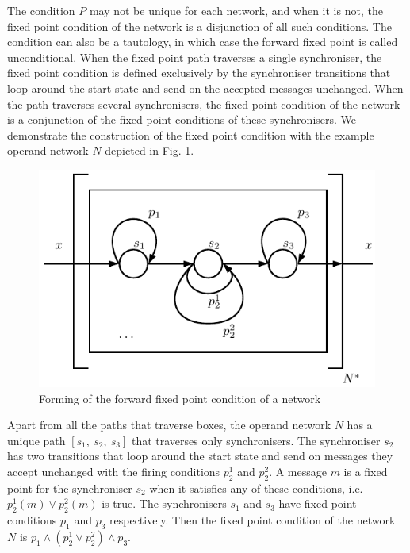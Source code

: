 The condition $P$ may not be unique for each network, and when it is not, the fixed point condition of the network is a disjunction of all such conditions. The condition can also be a tautology, in which case the forward fixed point is called unconditional. When the fixed point path traverses a single synchroniser, the fixed point condition is defined exclusively by the synchroniser transitions that loop around the start state and send on the accepted messages unchanged. When the path traverses several synchronisers, the fixed point condition of the network is a conjunction of the fixed point conditions of these synchronisers. We demonstrate the construction of the fixed point condition with the example operand network $N$ depicted in Fig. \ref{fig:ffp}.

\begin{figure}[h!]
\centering
\includegraphics[scale=0.8]{figs/chapter_04_ffp.pdf}
\caption{Forming of the forward fixed point condition of a network}
\label{fig:ffp}
\end{figure}

Apart from all the paths that traverse boxes, the operand network $N$ has a unique path $[s_1, \: s_2, \: s_3]$ that traverses only synchronisers. The synchroniser $s_2$ has two transitions that loop around the start state and send on messages they accept unchanged with the firing conditions $p^{1}_2$ and $p^{2}_2$. A message $m$ is a fixed point for the synchroniser $s_2$ when it satisfies any of these conditions, i.e. $p^{1}_2(m) \lor p^{2}_2(m)$ is true. The synchronisers $s_1$ and $s_3$ have fixed point conditions $p_1$ and $p_3$ respectively. Then the fixed point condition of the network $N$ is $p_1 \land (p^{1}_2 \lor p^{2}_2) \land p_3$.


